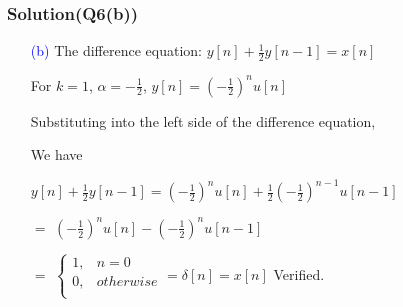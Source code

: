 \documentclass{beamer}
\newcommand{\blue}[1]{\textcolor{blue}{#1}}
\begin{document}
\begin{frame}
\frametitle{Solution(Q6(b))}

\begin{itemize} \itemsep1pt \parskip0pt 
  \item[\blue{(b)}] The difference equation: $y[n]+\frac{1}{2}y[n-1]=x[n]$
  \item[] For $k = 1$, $\alpha = -\frac{1}{2}$, $y[n]=(-\frac{1}{2})^nu[n]$
  \item[] Substituting into the left side of the difference equation,
  \item[] We have
\end{itemize}


\begin{itemize} \itemsep10pt \parskip0pt 
  \item[] $y[n] + \frac{1}{2}y[n-1] = (-\frac{1}{2})^nu[n] + \frac{1}{2}(-\frac{1}{2})^{n-1}u[n-1]$
  \item[$=$] $(-\frac{1}{2})^nu[n] - (-\frac{1}{2})^nu[n-1]$
  \item[$=$] $\begin{cases}
              1,&n=0\\
              0,&otherwise\\
            \end{cases}=\delta[n] = x[n]$ \hspace{8 mm}Verified.
\end{itemize}


\end{frame}
\end{document}
